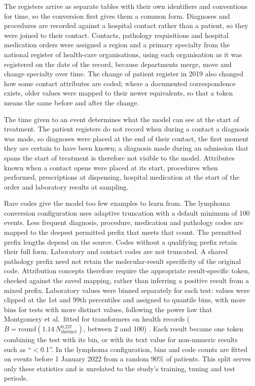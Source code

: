 The registers arrive as separate tables with their own identifiers and
conventions for time, so the conversion first gives them a common form.
Diagnoses and procedures are recorded against a hospital contact rather than a
patient, so they were joined to their contact. Contacts, pathology requisitions
and hospital medication orders were assigned a region and a primary specialty
from the national register of health-care organisations, using each
organisation as it was registered on the date of the record, because
departments merge, move and change specialty over time. The change of patient
register in 2019 also changed how some contact attributes are coded; where a
documented correspondence exists, older values were mapped to their newer
equivalents, so that a token means the same before and after the change.

The time given to an event determines what the model can see at the start of
treatment. The patient registers do not record when during a contact a
diagnosis was made, so diagnoses were placed at the end of their contact, the
first moment they are certain to have been known; a diagnosis made during an
admission that spans the start of treatment is therefore not visible to the
model. Attributes known when a contact opens were placed at its start,
procedures when performed, prescriptions at dispensing, hospital medication at
the start of the order and laboratory results at sampling.

Rare codes give the model too few examples to learn from. The lymphoma
conversion configuration uses adaptive truncation with a default minimum of
100 events. Less frequent diagnosis, procedure, medication and pathology codes
are mapped to the deepest permitted prefix that meets that count. The
permitted prefix lengths depend on the source. Codes without a qualifying
prefix retain their full form. Laboratory and contact codes are not truncated.
A shared pathology prefix need not retain the molecular-result specificity of
the original code. Attribution concepts therefore require the appropriate
result-specific token, checked against the saved mapping, rather than inferring
a positive result from a mixed prefix. Laboratory values were binned
separately for each test: values were clipped at the 1st and 99th percentiles
and assigned to quantile bins, with more bins for tests with more distinct
values, following the power law that Montgomery et al.\ fitted for transformers
on health records ($B = \mathrm{round}(1.14\,N_{\mathrm{distinct}}^{0.237})$,
between 2 and 100) \citep{montgomery2026numeric}. Each result became one token
combining the test with its bin, or with its text value for non-numeric results
such as ``$<$0.1''. In the lymphoma configuration, bins and code counts are
fitted on events before 1 January 2022 from a random 90\% of patients. This
split serves only these statistics and is unrelated to the study's training,
tuning and test periods. 

